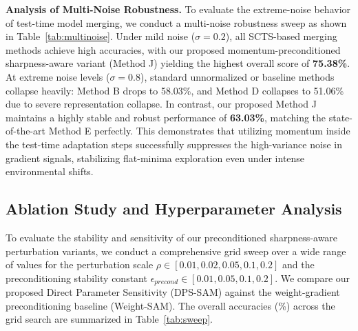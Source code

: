\documentclass{article}
\theoremstyle{plain}
\theoremstyle{definition}
\theoremstyle{remark}
\begin{document}
\textbf{Analysis of Multi-Noise Robustness.}
To evaluate the extreme-noise behavior of test-time model merging, we conduct a multi-noise robustness sweep as shown in Table~\ref{tab:multinoise}. Under mild noise ($\sigma = 0.2$), all SCTS-based merging methods achieve high accuracies, with our proposed momentum-preconditioned sharpness-aware variant (Method J) yielding the highest overall score of \textbf{75.38\%}. At extreme noise levels ($\sigma = 0.8$), standard unnormalized or baseline methods collapse heavily: Method B drops to 58.03\%, and Method D collapses to 51.06\% due to severe representation collapse. In contrast, our proposed Method J maintains a highly stable and robust performance of \textbf{63.03\%}, matching the state-of-the-art Method E perfectly. This demonstrates that utilizing momentum inside the test-time adaptation steps successfully suppresses the high-variance noise in gradient signals, stabilizing flat-minima exploration even under intense environmental shifts.

\subsection{Ablation Study and Hyperparameter Analysis}
To evaluate the stability and sensitivity of our preconditioned sharpness-aware perturbation variants, we conduct a comprehensive grid sweep over a wide range of values for the perturbation scale $\rho \in [0.01, 0.02, 0.05, 0.1, 0.2]$ and the preconditioning stability constant $\epsilon_{precond} \in [0.01, 0.05, 0.1, 0.2]$. We compare our proposed Direct Parameter Sensitivity (DPS-SAM) against the weight-gradient preconditioning baseline (Weight-SAM). The overall accuracies (\%) across the grid search are summarized in Table~\ref{tab:sweep}.
\end{document}
